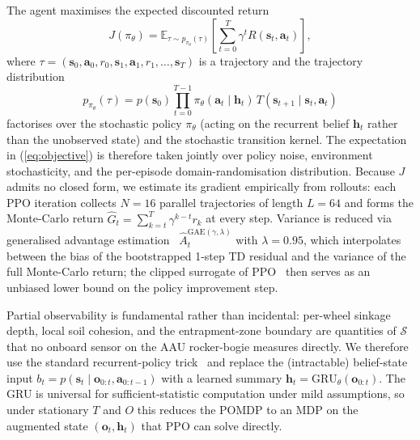\documentclass[conference]{IEEEtran}
\begin{document}
The agent maximises the expected discounted return
\begin{equation}
  J(\pi_\theta) = \mathbb{E}_{\tau \sim p_{\pi_\theta}(\tau)}
  \!\left[ \sum_{t=0}^{T} \gamma^t R(\mathbf{s}_t, \mathbf{a}_t) \right],
  \label{eq:objective}
\end{equation}
where $\tau = (\mathbf{s}_0, \mathbf{a}_0, r_0, \mathbf{s}_1, \mathbf{a}_1,
r_1, \ldots, \mathbf{s}_T)$ is a trajectory and the trajectory distribution
\[
  p_{\pi_\theta}(\tau) = p(\mathbf{s}_0)
  \prod_{t=0}^{T-1} \pi_\theta(\mathbf{a}_t\!\mid\!\mathbf{h}_t)\,
  T(\mathbf{s}_{t+1}\!\mid\!\mathbf{s}_t,\mathbf{a}_t)
\]
factorises over the stochastic policy $\pi_\theta$ (acting on the recurrent
belief $\mathbf{h}_t$ rather than the unobserved state) and the stochastic
transition kernel. The expectation in (\ref{eq:objective}) is therefore taken
jointly over policy noise, environment stochasticity, and the per-episode
domain-randomisation distribution. Because $J$ admits no closed form, we
estimate its gradient empirically from rollouts: each PPO iteration collects
$N{=}16$ parallel trajectories of length $L{=}64$ and forms the Monte-Carlo
return $\hat{G}_t = \sum_{k=t}^{T}\gamma^{k-t} r_k$ at every step. Variance is
reduced via generalised advantage estimation~\cite{schulman2015gae}
$\hat{A}_t^{\text{GAE}(\gamma,\lambda)}$ with
$\lambda{=}0.95$, which interpolates between the bias of the bootstrapped
1-step TD residual and the variance of the full Monte-Carlo return; the
clipped surrogate of PPO~\cite{schulman2017ppo} then serves as an unbiased
lower bound on the policy improvement step.

Partial observability is fundamental rather than incidental: per-wheel sinkage
depth, local soil cohesion, and the entrapment-zone boundary are quantities of
$\mathcal{S}$ that no onboard sensor on the AAU rocker-bogie measures
directly. We therefore use the standard recurrent-policy trick~\cite{cho2014gru}
and replace the (intractable) belief-state input $b_t = p(\mathbf{s}_t \mid
\mathbf{o}_{0:t}, \mathbf{a}_{0:t-1})$ with a learned summary
$\mathbf{h}_t = \text{GRU}_\theta(\mathbf{o}_{0:t})$. The GRU is universal for
sufficient-statistic computation under mild assumptions, so under stationary
$T$ and $O$ this reduces the POMDP to an MDP on the augmented state
$(\mathbf{o}_t, \mathbf{h}_t)$ that PPO can solve directly.
\end{document}
